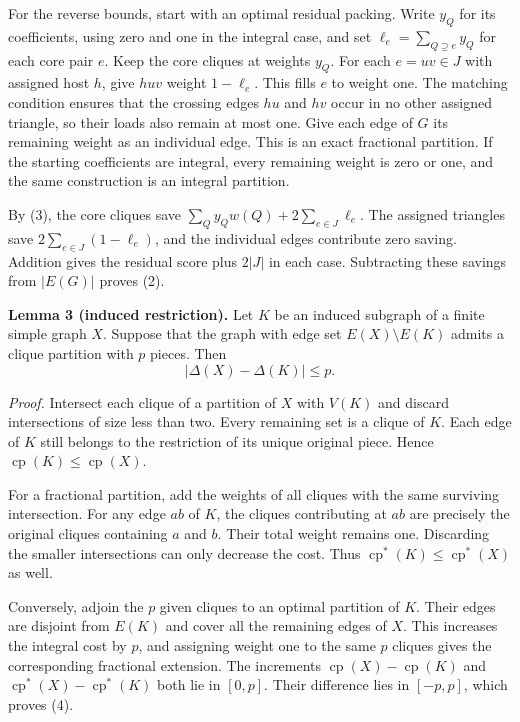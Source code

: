 \documentclass[english,11pt,a4paper]{article}
\begin{document}
For the reverse bounds, start with an optimal residual packing. Write \(y_Q\) for its coefficients, using zero and one in the integral case, and set \(\ell_e=\sum_{Q\supseteq e}y_Q\) for each core pair \(e\). Keep the core cliques at weights \(y_Q\). For each \(e=uv\in J\) with assigned host \(h\), give \(huv\) weight \(1-\ell_e\). This fills \(e\) to weight one. The matching condition ensures that the crossing edges \(hu\) and \(hv\) occur in no other assigned triangle, so their loads also remain at most one. Give each edge of \(G\) its remaining weight as an individual edge. This is an exact fractional partition. If the starting coefficients are integral, every remaining weight is zero or one, and the same construction is an integral partition.

By (3), the core cliques save \(\sum_Q y_Qw(Q)+2\sum_{e\in J}\ell_e\). The assigned triangles save \(2\sum_{e\in J}(1-\ell_e)\), and the individual edges contribute zero saving. Addition gives the residual score plus \(2|J|\) in each case. Subtracting these savings from \(|E(G)|\) proves (2).

\textbf{Lemma 3 (induced restriction).} Let \(K\) be an induced subgraph of a finite simple graph \(X\). Suppose that the graph with edge set \(E(X)\setminus E(K)\) admits a clique partition with \(p\) pieces. Then
\[
|\Delta(X)-\Delta(K)|\le p. \tag{4}
\]

\emph{Proof.} Intersect each clique of a partition of \(X\) with \(V(K)\) and discard intersections of size less than two. Every remaining set is a clique of \(K\). Each edge of \(K\) still belongs to the restriction of its unique original piece. Hence \(\operatorname{cp}(K)\le\operatorname{cp}(X)\).

For a fractional partition, add the weights of all cliques with the same surviving intersection. For any edge \(ab\) of \(K\), the cliques contributing at \(ab\) are precisely the original cliques containing \(a\) and \(b\). Their total weight remains one. Discarding the smaller intersections can only decrease the cost. Thus \(\operatorname{cp}^{\ast}(K)\le\operatorname{cp}^{\ast}(X)\) as well.

Conversely, adjoin the \(p\) given cliques to an optimal partition of \(K\). Their edges are disjoint from \(E(K)\) and cover all the remaining edges of \(X\). This increases the integral cost by \(p\), and assigning weight one to the same \(p\) cliques gives the corresponding fractional extension. The increments \(\operatorname{cp}(X)-\operatorname{cp}(K)\) and \(\operatorname{cp}^{\ast}(X)-\operatorname{cp}^{\ast}(K)\) both lie in \([0,p]\). Their difference lies in \([-p,p]\), which proves (4).
\end{document}
